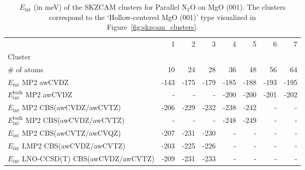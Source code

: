 \begin{table}
\caption{\label{tab:system_eint_mgo_n2o_parallel}$E_\textrm{int}$ (in meV) of the SKZCAM clusters for Parallel N$_2$O on MgO (001). The clusters correspond to the `Hollow-centered MgO (001)' type visualized in Figure~\ref{fig:skzcam_clusters}.}
\begin{adjustbox}{center,max width=1.4\textwidth}
\begin{tabular}{lrrrrrrr}
\toprule
 & 1 & 2 & 3 & 4 & 5 & 6 & 7 \\ 
Cluster &  &  &  &  &  &  &  \\
\midrule
\# of atoms & 10 & 24 & 28 & 36 & 48 & 56 & 64 \\
$E_\textrm{int}$ MP2 awCVDZ & -143 & -175 & -179 & -185 & -188 & -193 & -195 \\
$E_\textrm{int}^\textrm{bulk}$ MP2 awCVDZ & - & - & - & -200 & -200 & -201 & -202 \\
$E_\textrm{int}$ MP2 CBS(awCVDZ/awCVTZ) & -206 & -229 & -232 & -238 & -242 & - & - \\
$E_\textrm{int}^\textrm{bulk}$ MP2 CBS(awCVDZ/awCVTZ) & - & - & - & -248 & -249 & - & - \\
$E_\textrm{int}$ MP2 CBS(awCVTZ/awCVQZ) & -207 & -231 & -230 & - & - & - & - \\
$E_\textrm{int}$ LMP2 CBS(awCVDZ/awCVTZ) & -203 & -225 & -226 & - & - & - & - \\
$E_\textrm{int}$ LNO-CCSD(T) CBS(awCVDZ/awCVTZ) & -209 & -231 & -233 & - & - & - & - \\
\bottomrule
\end{tabular}
\end{adjustbox}
\end{table}

